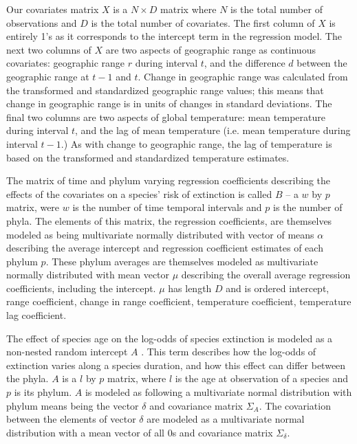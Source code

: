 \documentclass[12pt,letterpaper]{article}
\begin{document}
\begin{refsection}
Our covariates matrix \(X\) is a \(N \times D\) matrix where \(N\) is the total number of observations and \(D\) is the total number of covariates. The first column of \(X\) is entirely 1's as it corresponds to the intercept term in the regression model. The next two columns of \(X\) are two aspects of geographic range as continuous covariates: geographic range \(r\) during interval \(t\), and the difference \(d\) between the geographic range at \(t - 1\) and \(t\). Change in geographic range was calculated from the transformed and standardized geographic range values; this means that change in geographic range is in units of changes in standard deviations. The final two columns are two aspects of global temperature: mean temperature during interval \(t\), and the lag of mean temperature (i.e. mean temperature during interval \(t - 1\).) As with change to geographic range, the lag of temperature is based on the transformed and standardized temperature estimates. 

The matrix of time and phylum varying regression coefficients describing the effects of the covariates on a species' risk of extinction is called \(B\) -- a \(w\) by \(p\) matrix, were \(w\) is the number of time temporal intervals and \(p\) is the number of phyla. The elements of this matrix, the regression coefficients, are themselves modeled as being multivariate normally distributed with vector of means \(\alpha\) describing the average intercept and regression coefficient estimates of each phylum \(p\). These phylum averages are themselves modeled as multivariate normally distributed with mean vector \(\mu\) describing the overall average regression coefficients, including the intercept. \(\mu\) has length \(D\) and is ordered intercept, range coefficient, change in range coefficient, temperature coefficient, temperature lag coefficient.

The effect of species age on the log-odds of species extinction is modeled as a non-nested random intercept \(A\) \citep{Tutz2016}. This term describes how the log-odds of extinction varies along a species duration, and how this effect can differ between the phyla. \(A\) is a \(l\) by \(p\) matrix, where \(l\) is the age at observation of a species and \(p\) is its phylum. \(A\) is modeled as following a multivariate normal distribution with phylum means being the vector \(\delta\) and covariance matrix \(\Sigma_{A}\). The covariation between the elements of vector \(\delta\) are modeled as a multivariate normal distribution with a mean vector of all 0s and covariance matrix \(\Sigma_{\delta}\).


\end{refsection}
\end{document}
